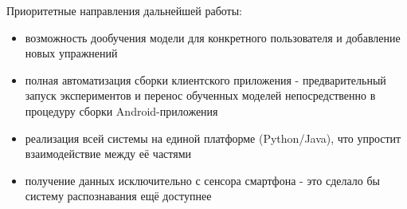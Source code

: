 Приоритетные направления дальнейшей работы: 

\begin{itemize}
\item возможность дообучения модели для конкретного пользователя и добавление новых упражнений
\item полная автоматизация сборки клиентского приложения - предварительный запуск экспериментов и перенос обученных моделей непосредственно в процедуру сборки Android-приложения
\item реализация всей системы на единой платформе (Python/Java), что упростит взаимодействие между её частями
\item получение данных исключительно с сенсора смартфона - это сделало бы систему распознавания ещё доступнее
\end{itemize}

